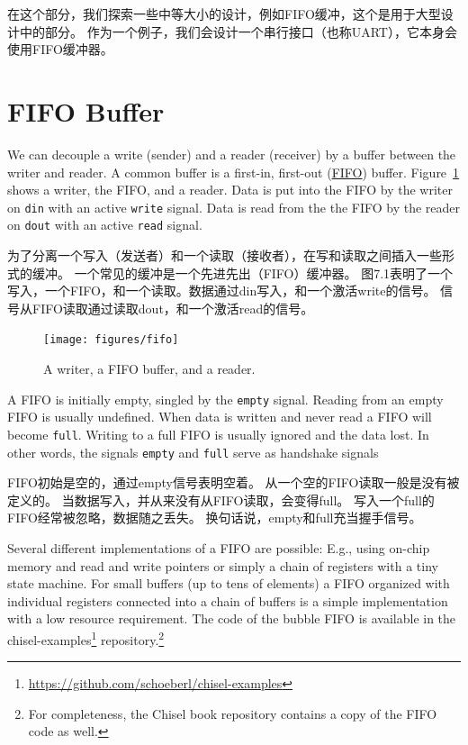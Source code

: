 \documentclass[%
    10pt,
    headinclude, footexclude,
    openright, %
    notitlepage,
    cleardoubleempty,
    headsepline,
    pointlessnumbers,
    bibtotoc, idxtotoc,
    ]{scrbook}
\newcommand{\code}[1]{{\small{\texttt{#1}}}}
\newcommand{\myref}[2]{\href{#1}{#2}}
\renewcommand{\myref}[2]{{#2}{\footnote{\url{#1}}}}
\begin{document}
{在这个部分，我们探索一些中等大小的设计，例如FIFO缓冲，这个是用于大型设计中的部分。
作为一个例子，我们会设计一个串行接口（也称UART），它本身会使用FIFO缓冲器。

\section{FIFO Buffer}
\label{sec:fifo}

We can decouple a write (sender) and a reader (receiver) by a buffer
between the writer and reader.
A common buffer is a first-in, first-out
(\href{https://en.wikipedia.org/wiki/FIFO_%28computing_and_electronics%29}{FIFO})
buffer. Figure~\ref{fig:fifo} shows a writer, the FIFO, and a reader.
Data is put into the FIFO by the writer on \code{din} with an active
\code{write} signal. Data is read from the the FIFO by the reader on
\code{dout} with an active \code{read} signal.

为了分离一个写入（发送者）和一个读取（接收者），在写和读取之间插入一些形式的缓冲。
一个常见的缓冲是一个先进先出（FIFO）缓冲器。
图7.1表明了一个写入，一个FIFO，和一个读取。数据通过din写入，和一个激活write的信号。
信号从FIFO读取通过读取dout，和一个激活read的信号。

\begin{figure}
  \centering
  \texttt{[image: figures/fifo]}
  \caption{A writer, a FIFO buffer, and a reader.}
  \label{fig:fifo}
\end{figure}

A FIFO is initially empty, singled by the \code{empty} signal. Reading
from an empty FIFO is usually undefined. When data is written and never
read a FIFO will become \code{full}. Writing to a full FIFO is usually ignored
and the data lost. In other words, the signals \code{empty} and \code{full}
serve as handshake signals 

FIFO初始是空的，通过empty信号表明空着。
从一个空的FIFO读取一般是没有被定义的。
当数据写入，并从来没有从FIFO读取，会变得full。
写入一个full的FIFO经常被忽略，数据随之丢失。
换句话说，empty和full充当握手信号。

Several different implementations of a FIFO are possible: E.g., using on-chip
memory and read and write pointers or simply a chain of registers with a
tiny state machine. For small buffers (up to tens of elements) a FIFO organized
with individual registers connected into a chain of buffers is a simple
implementation with a low resource requirement.
The code of the bubble FIFO is available in the
\myref{https://github.com/schoeberl/chisel-examples}{chisel-examples}
repository.\footnote{For completeness, the Chisel book repository contains
a copy of the FIFO code as well.}

}
\end{document}
